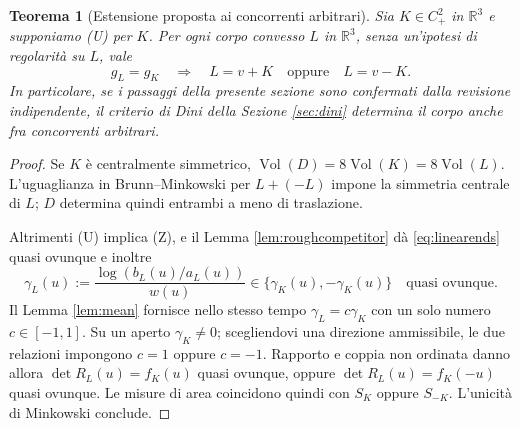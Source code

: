\documentclass[11pt,a4paper]{article}
\newtheorem{theorem}{Teorema}
\theoremstyle{remark}
\newcommand{\R}{\mathbb R}
\newcommand{\vol}{\operatorname{Vol}}
\begin{document}
\begin{theorem}[Estensione proposta ai concorrenti arbitrari]\label{thm:allcompetitors}
Sia $K\in C^2_+$ in $\R^3$ e supponiamo (U) per $K$.
Per ogni corpo convesso $L$ in $\R^3$, senza un'ipotesi di regolarità
su $L$, vale
\[
g_L=g_K\quad\Longrightarrow\quad L=v+K\quad\text{oppure}\quad L=v-K.
\]
In particolare, se i passaggi della presente sezione sono confermati
dalla revisione indipendente, il criterio di Dini della Sezione
\ref{sec:dini} determina il corpo anche fra concorrenti arbitrari.
\end{theorem}
\begin{proof}
Se $K$ è centralmente simmetrico, $\vol(D)=8\vol(K)=8\vol(L)$.
L'uguaglianza in Brunn--Minkowski per $L+(-L)$ impone la simmetria
centrale di $L$; $D$ determina quindi entrambi a meno di traslazione.

Altrimenti (U) implica (Z), e il Lemma \ref{lem:roughcompetitor} dà
\eqref{eq:linearends} quasi ovunque e inoltre
\[
\gamma_L(u):=\frac{\log(b_L(u)/a_L(u))}{w(u)}
\in\{\gamma_K(u),-\gamma_K(u)\}\quad\text{quasi ovunque}.
\]
Il Lemma \ref{lem:mean} fornisce nello stesso tempo
$\gamma_L=c\gamma_K$ con un solo numero $c\in[-1,1]$.
Su un aperto $\gamma_K\ne0$; scegliendovi una direzione ammissibile,
le due relazioni impongono $c=1$ oppure $c=-1$.
Rapporto e coppia non ordinata danno allora
$\det R_L(u)=f_K(u)$ quasi ovunque, oppure
$\det R_L(u)=f_K(-u)$ quasi ovunque. Le misure di area coincidono
quindi con $S_K$ oppure $S_{-K}$. L'unicità di Minkowski conclude.
\end{proof}
\end{document}
